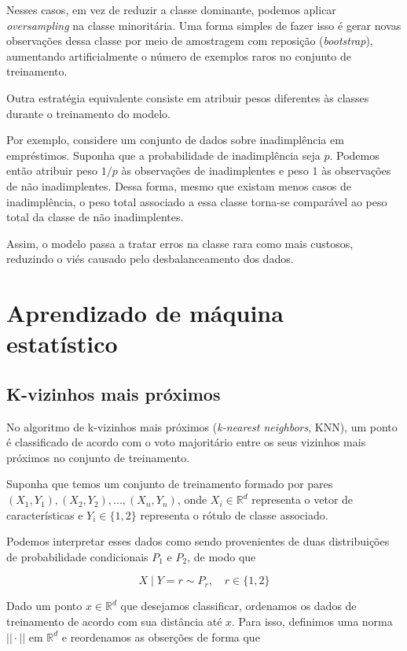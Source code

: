 \documentclass{article}
\begin{document}
Nesses casos, em vez de reduzir a classe dominante, podemos aplicar
\textit{oversampling} na classe minoritária. Uma forma simples de fazer isso
é gerar novas observações dessa classe por meio de amostragem com reposição
(\textit{bootstrap}), aumentando artificialmente o número de exemplos raros
no conjunto de treinamento.

Outra estratégia equivalente consiste em atribuir pesos diferentes às classes
durante o treinamento do modelo.

Por exemplo, considere um conjunto de dados sobre inadimplência em empréstimos.
Suponha que a probabilidade de inadimplência seja $p$. Podemos então atribuir
peso $1/p$ às observações de inadimplentes e peso $1$ às observações de
não inadimplentes. Dessa forma, mesmo que existam menos casos de inadimplência,
o peso total associado a essa classe torna-se comparável ao peso total da
classe de não inadimplentes.

Assim, o modelo passa a tratar erros na classe rara como mais custosos,
reduzindo o viés causado pelo desbalanceamento dos dados.

\section{Aprendizado de máquina estatístico}

\subsection{K-vizinhos mais próximos}

No algoritmo de k-vizinhos mais próximos (\textit{k-nearest neighbors}, KNN),
um ponto é classificado de acordo com o voto majoritário entre os seus 
vizinhos mais próximos no conjunto de treinamento.

Suponha que temos um conjunto de treinamento formado por pares
$(X_1, Y_1), (X_2, Y_2), ..., (X_n, Y_n)$, onde
$X_i \in \mathbb{R}^{d}$ representa o vetor de características e
$Y_i \in \{1,2\}$ representa o rótulo de classe associado.

Podemos interpretar esses dados como sendo provenientes de duas 
distribuições de probabilidade condicionais $P_1$ e $P_2$, de 
modo que

\begin{equation}
    X \mid Y = r \sim P_r, \quad r \in \{1, 2\}
\end{equation}

Dado um ponto $x \in \mathbb{R}^{d}$ que desejamos classificar, 
ordenamos os dados de treinamento de acordo com sua distância até $x$.
Para isso, definimos uma norma $|| \cdot ||$ em $\mathbb{R}^{d}$ e 
reordenamos as obserções de forma que 
\end{document}
